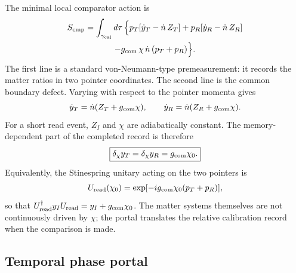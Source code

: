 \documentclass[aps,prd,twocolumn,10pt,superscriptaddress,nofootinbib]{revtex4-2}
\begin{document}
The minimal local comparator action is
\begin{multline}
 S_{\rm cmp}=\int_{\gamma_{\rm cal}}d\tau\,
 \Big\{
 p_T[\dot y_T-\dot n\,Z_T]
 +p_R[\dot y_R-\dot n\,Z_R]\\
 -g_{\rm com}\,\chi\,\dot n\,(p_T+p_R)
 \Big\}.
 \label{eq:portal_comparator_action}
\end{multline}
The first line is a standard von-Neumann-type premeasurement: it records the
matter ratios in two pointer coordinates.  The second line is the common
boundary defect.  Varying with respect to the pointer momenta gives
\begin{equation}
 \dot y_T=\dot n(Z_T+g_{\rm com}\chi),
 \qquad
 \dot y_R=\dot n(Z_R+g_{\rm com}\chi).
 \label{eq:portal_pointer_eom}
\end{equation}
For a short read event, $Z_I$ and $\chi$ are adiabatically constant.  The
memory-dependent part of the completed record is therefore
\begin{equation}
 \boxed{
 \delta_\chi y_T=\delta_\chi y_R=g_{\rm com}\chi_0 .}
 \label{eq:portal_equal_pointer_shift}
\end{equation}
Equivalently, the Stinespring unitary acting on the two pointers is
\begin{equation}
 U_{\rm read}(\chi_0)
 =\exp[-ig_{\rm com}\chi_0(p_T+p_R)],
 \label{eq:portal_stinespring_gate}
\end{equation}
so that $U_{\rm read}^\dagger y_IU_{\rm read}=y_I+g_{\rm com}\chi_0$.
The matter systems themselves are not continuously driven by $\chi$; the
portal translates the relative calibration record when the comparison is
made.

\subsection{Temporal phase portal}
\label{sec:temporal_portal_complete}
\end{document}
